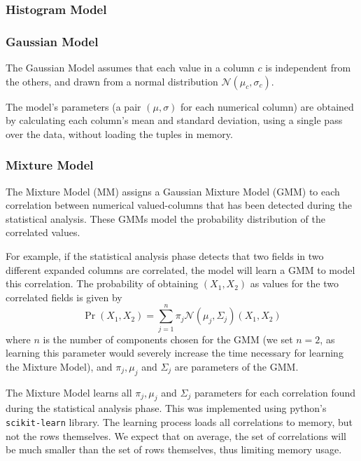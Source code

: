 
\subsubsection{Histogram Model}
\subsubsection{Gaussian Model}
The Gaussian Model assumes that each value in a column $c$ is  independent from the others, and drawn from a normal distribution $\mathcal N(\mu_c, \sigma_c)$.

The model's parameters (a pair $(\mu, \sigma)$ for each numerical column) are obtained by calculating each column's mean and standard deviation, using a single pass over the data, without loading the tuples in memory.

\subsubsection{Mixture Model}

The Mixture Model (MM) assigns a Gaussian Mixture Model (GMM) to each correlation between numerical valued-columns that has been detected during the statistical analysis. These GMMs model the probability distribution of the correlated values.

For example, if the statistical analysis phase detects that two fields in two different expanded columns are correlated, the model will learn a GMM to model this correlation. The probability of obtaining $(X_1, X_2)$ as values for the two correlated fields is given by
\[\Pr(X_1, X_2) = \sum_{j=1}^{n} \pi_j \mathcal N(\mu_j, \Sigma_j)(X_1, X_2)\]
where $n$ is the number of components chosen for the GMM (we set $n=2$, as learning this parameter would severely increase the time necessary for learning the Mixture Model), and $\pi_j, \mu_j$ and $\Sigma_j$ are parameters of the GMM. 

The Mixture Model learns all  $\pi_j, \mu_j$ and $\Sigma_j$ parameters for each correlation found during the statistical analysis phase. This was implemented using python's \texttt{scikit-learn} library. The learning process loads all correlations to memory, but not the rows themselves. We expect that on average, the set of correlations will be much smaller than the set of rows themselves, thus limiting memory usage.


